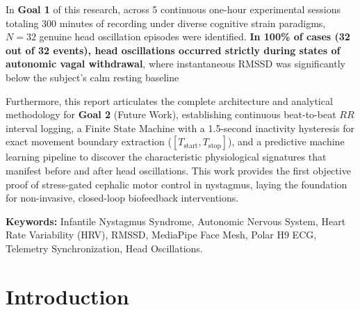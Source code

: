 \documentclass[12pt,a4paper,oneside]{report}
\begin{document}
In \textbf{Goal 1} of this research, across 5 continuous one-hour experimental sessions totaling 300 minutes of recording under diverse cognitive strain paradigms, $N=32$ genuine head oscillation episodes were identified. \textbf{In 100\% of cases (32 out of 32 events), head oscillations occurred strictly during states of autonomic vagal withdrawal}, where instantaneous RMSSD was significantly below the subject's calm resting baseline 

Furthermore, this report articulates the complete architecture and analytical methodology for \textbf{Goal 2} (Future Work), establishing continuous beat-to-beat $RR$ interval logging, a Finite State Machine with a 1.5-second inactivity hysteresis for exact movement boundary extraction ($[T_{\text{start}}, T_{\text{stop}}]$), and a predictive machine learning pipeline to discover the characteristic physiological signatures that manifest before and after head oscillations. This work provides the first objective proof of stress-gated cephalic motor control in nystagmus, laying the foundation for non-invasive, closed-loop biofeedback interventions.

\vspace{0.5cm}
\noindent \textbf{Keywords:} Infantile Nystagmus Syndrome, Autonomic Nervous System, Heart Rate Variability (HRV), RMSSD, MediaPipe Face Mesh, Polar H9 ECG, Telemetry Synchronization, Head Oscillations.

\cleardoublepage
{}
\tableofcontents

\cleardoublepage
{}
\listoffigures

\listoftables

\cleardoublepage
{}
\setcounter{page}{1}

\chapter{Introduction}
\label{chap:intro}
\end{document}
